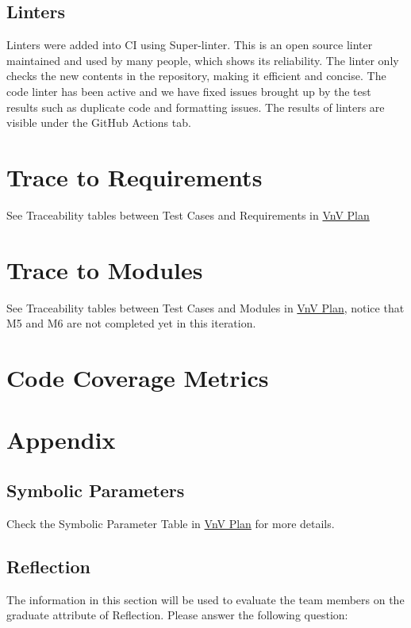 \documentclass[12pt, titlepage]{article}
\begin{document}
\subsection{Linters}

Linters were added into CI using Super-linter. This is an open source linter maintained and used by many people, which shows its reliability.
The linter only checks the new contents in the repository, making it efficient and concise. 
The code linter has been active and we have fixed issues brought up by the test results such as duplicate code and formatting issues.
The results of linters are visible under the GitHub Actions tab.

\section{Trace to Requirements}
See Traceability tables between Test Cases and Requirements in \href{https://github.com/beatlepie/4G06CapstoneProjectTeam2/blob/main/docs/VnVPlan/VnVPlan.pdf}{VnV Plan}
\section{Trace to Modules}		
See Traceability tables between Test Cases and Modules in \href{https://github.com/beatlepie/4G06CapstoneProjectTeam2/blob/main/docs/VnVPlan/VnVPlan.pdf}{VnV Plan}, notice that M5 and M6 are not completed yet in this iteration.

\section{Code Coverage Metrics}




\newpage{}
\section*{Appendix}
\subsection{Symbolic Parameters}
Check the Symbolic Parameter Table in \href{https://github.com/beatlepie/4G06CapstoneProjectTeam2/blob/main/docs/VnVPlan/VnVPlan.pdf}{VnV Plan} for more details.

\subsection{Reflection}
The information in this section will be used to evaluate the team members on the
graduate attribute of Reflection.  Please answer the following question:
\end{document}
